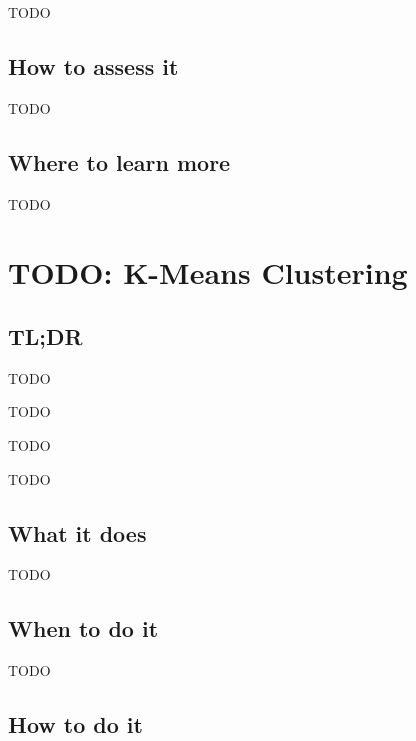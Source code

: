\documentclass[
]{book}
\providecommand{\tightlist}{%
  \setlength{\itemsep}{0pt}\setlength{\parskip}{0pt}}
\begin{document}
TODO

\hypertarget{how-to-assess-it-20}{%
\section{How to assess it}\label{how-to-assess-it-20}}

TODO

\hypertarget{where-to-learn-more-20}{%
\section{Where to learn more}\label{where-to-learn-more-20}}

TODO

\hypertarget{k-means-clustering}{%
\chapter{TODO: K-Means Clustering}\label{k-means-clustering}}

\hypertarget{tldr-21}{%
\section{TL;DR}\label{tldr-21}}

\begin{description}
\tightlist
\item[What it does]
TODO
\item[When to do it]
TODO
\item[How to do it]
TODO
\item[How to assess it]
TODO
\end{description}

\hypertarget{what-it-does-21}{%
\section{What it does}\label{what-it-does-21}}

TODO

\hypertarget{when-to-do-it-21}{%
\section{When to do it}\label{when-to-do-it-21}}

TODO

\hypertarget{how-to-do-it-21}{%
\section{How to do it}\label{how-to-do-it-21}}
\end{document}
